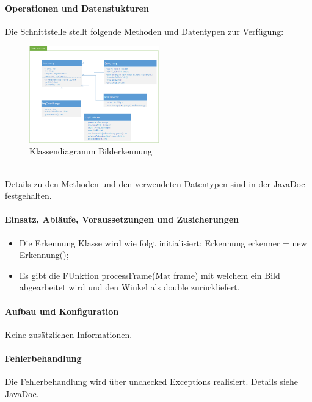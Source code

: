 \paragraph{Operationen und Datenstukturen}

Die Schnittstelle stellt folgende Methoden und Datentypen zur Verfügung:  \\
\begin{figure}[h!]          
	\centering             
	\includegraphics[width=0.5\textwidth]{fig/Klassendiagramm_Erkennung.png}
	\caption{Klassendiagramm Bilderkennung}
	\label{fig:Klassendiagramm Bilderkennung}        
\end{figure} \\
Details zu den Methoden und den verwendeten Datentypen sind in der JavaDoc festgehalten. \\

\paragraph{Einsatz, Abläufe, Voraussetzungen und Zusicherungen}
\begin{itemize}
	\item{Die Erkennung Klasse wird wie folgt initialisiert: Erkennung erkenner = new Erkennung(); }
	\item{Es gibt die FUnktion processFrame(Mat frame) mit welchem ein Bild abgearbeitet wird und den Winkel als double zurückliefert.}
\end{itemize}

\paragraph{Aufbau und Konfiguration} 
Keine zusätzlichen Informationen. \\

\paragraph{Fehlerbehandlung}
Die Fehlerbehandlung wird über unchecked Exceptions realisiert. Details siehe JavaDoc. \\

